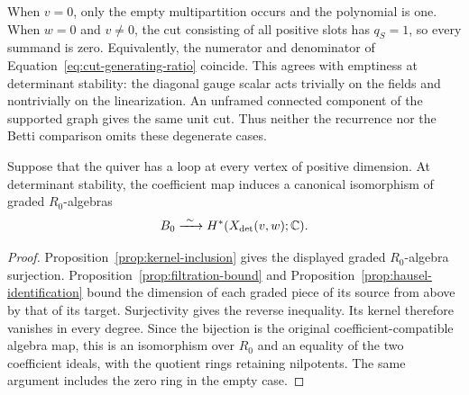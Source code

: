 \begin{remark}\label{rem:counting-empty-cases}
When $v=0$, only the empty multipartition occurs and the polynomial is one.
When $w=0$ and $v\ne0$, the cut consisting of all positive slots has
$q_S=1$, so every summand is zero.  Equivalently, the numerator and
denominator of Equation~\eqref{eq:cut-generating-ratio} coincide.  This
agrees with emptiness at determinant stability: the diagonal gauge scalar
acts trivially on the fields and nontrivially on the linearization.  An
unframed connected component of the supported graph gives the same unit
cut.  Thus neither the recurrence nor the Betti comparison omits these
degenerate cases.
\end{remark}

\begin{corollary}\label{cor:loop-isomorphism}
Suppose that the quiver has a loop at every vertex of positive dimension.
At determinant stability, the coefficient map induces a canonical
isomorphism of graded $R_0$-algebras
\[
 B_0\xrightarrow{\ \sim\ }H^*(X_{\det}(v,w);\C).
\]
\end{corollary}

\begin{proof}
Proposition~\ref{prop:kernel-inclusion} gives the displayed graded
$R_0$-algebra surjection.  Proposition~\ref{prop:filtration-bound} and
Proposition~\ref{prop:hausel-identification} bound the dimension of each
graded piece of its source from above by that of its target.  Surjectivity
gives the reverse inequality.  Its kernel therefore vanishes in every
degree.  Since the bijection is the original coefficient-compatible
algebra map, this is an isomorphism over $R_0$ and an equality of the two
coefficient ideals, with the quotient rings retaining nilpotents.  The same argument
includes the zero ring in the empty case.
\end{proof}
